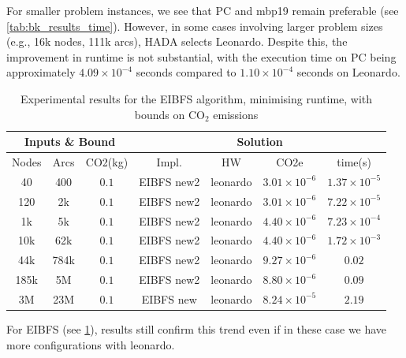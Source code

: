 \documentclass[a4paper,singleside,12pt]{report} %
\begin{document}
For smaller problem instances, we see that PC and mbp19 remain preferable (see \ref{tab:bk_results_time}). However, in some cases involving larger problem sizes (e.g., 16k nodes, 111k arcs), HADA selects Leonardo. 
Despite this, the improvement in runtime is not substantial, with the execution time on PC being approximately $4.09 \times 10^{-4}$ seconds compared to $1.10 \times 10^{-4}$ 
seconds on Leonardo.

\begin{table}[h!]
    \centering
    \begin{tabular}{|ccc|cccc|}
        \hline
        \multicolumn{3}{|c|}{Inputs \& Bound} & \multicolumn{4}{c|}{Solution} \\
        \hline
        Nodes & Arcs & CO2(kg) & Impl. & HW & CO2e & time(s) \\
        \hline
        40 & 400 & $0.1$ & EIBFS new2 & leonardo & $3.01 \times 10^{-6}$ & $1.37 \times 10^{-5}$ \\
        120 & 2k & $0.1$ & EIBFS new2 & leonardo & $3.01 \times 10^{-6}$ & $7.22 \times 10^{-5}$ \\
        1k & 5k & $0.1$ & EIBFS new2 & leonardo & $4.40 \times 10^{-6}$ & $7.23 \times 10^{-4}$ \\
        10k & 62k & $0.1$ & EIBFS new2 & leonardo & $4.40 \times 10^{-6}$ & $1.72 \times 10^{-3}$ \\
        44k & 784k & $0.1$ & EIBFS new2 & leonardo & $9.27 \times 10^{-6}$ & $0.02$ \\
        185k & 5M & $0.1$ & EIBFS new2 & leonardo & $8.80 \times 10^{-6}$ & $0.09$ \\
        3M & 23M & $0.1$ & EIBFS new & leonardo & $8.24 \times 10^{-5}$& $2.19$ \\
        \hline
    \end{tabular}
    \caption{Experimental results for the EIBFS algorithm, minimising runtime, with bounds on CO$_2$ emissions}
    \label{tab:eibfs_results_runtime}
\end{table}

For EIBFS (see \ref{tab:eibfs_results_runtime}), results still confirm this trend even if in these case we have more configurations with leonardo.
\end{document}
